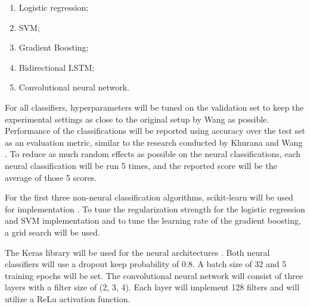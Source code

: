 \begin{enumerate}
    \item Logistic regression;
    \item SVM;
    \item Gradient Boosting;
    \item Bidirectional LSTM;
    \item Convolutional neural network.
\end{enumerate}

For all classifiers, hyperparameters will be tuned on the validation set to keep the experimental settings as close to the original setup by Wang as possible.
Performance of the classifications will be reported using accuracy over the test set as an evaluation metric, similar to the research conducted by Khurana and Wang \cite{wang2018}\cite{khurana2017}. 
To reduce as much random effects as possible on the neural classifications, each neural classification will be run 5 times, and the reported score will be the average of those 5 scores. 

For the first three non-neural classification algorithms, scikit-learn will be used for implementation \cite{scikit-learn}. 
To tune the regularization strength for the logistic regression and SVM implementation and to tune the learning rate of the gradient boosting, a grid search will be used. 

The Keras library will be used for the neural architectures \cite{keras}.
Both neural classifiers will use a dropout keep probability of 0.8.
A batch size of 32 and 5 training epochs will be set. 
The convolutional neural network will consist of three layers with a filter size of (2, 3, 4).
Each layer will implement 128 filters and will utilize a ReLu activation function.